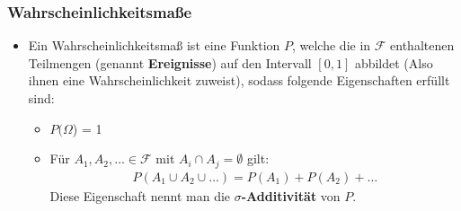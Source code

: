 \documentclass{scrartcl}
\newcommand{\mc}[1]{\mathcal{#1}}
\begin{document}
\subsubsection*{Wahrscheinlichkeitsmaße}
\begin{itemize}
    \item Ein Wahrscheinlichkeitsmaß ist eine Funktion $P$, welche die in $\mc{F}$ enthaltenen Teilmengen (genannt \textbf{Ereignisse}) auf den Intervall $[0,1]$ abbildet (Also ihnen eine Wahrscheinlichkeit zuweist), sodass folgende Eigenschaften erfüllt sind:
    \begin{itemize}
        \item $P(\Omega$) = 1
        \item Für $A_1, A_2, \hdots \in \mc{F}$ mit $A_i \cap A_j = \emptyset$ gilt:
        \begin{align*}
            P(A_1 \cup A_2 \cup \hdots) = P(A_1) + P(A_2) + \hdots
        \end{align*}
        Diese Eigenschaft nennt man die \textbf{$\sigma$-Additivität} von $P$. 
        

\end{itemize}
\end{itemize}
\end{document}
